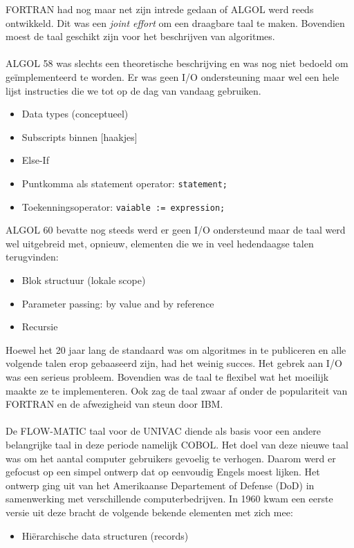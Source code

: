 \documentclass[../main.tex]{subfiles}
\begin{document}
\begin{solution}
FORTRAN had nog maar net zijn intrede gedaan of ALGOL werd reeds ontwikkeld.
Dit was een \emph{joint effort} om een draagbare taal te maken. Bovendien moest de taal geschikt zijn voor het beschrijven van algoritmes.
\\\\
ALGOL 58 was slechts een theoretische beschrijving en was nog niet bedoeld om ge\"implementeerd te worden.
Er was geen I/O ondersteuning maar wel een hele lijst instructies die we tot op de dag van vandaag gebruiken.
\begin{itemize}
		\item Data types (conceptueel)
		\item Subscripts binnen [haakjes]
		\item Else-If
		\item Puntkomma als statement operator: \texttt{statement;}
		\item Toekenningsoperator: \texttt{vaiable := expression;}
\end{itemize}
ALGOL 60 bevatte nog steeds werd er geen I/O ondersteund maar de taal werd wel uitgebreid met, opnieuw, elementen die we in veel hedendaagse talen terugvinden:
\begin{itemize}
		\item Blok structuur (lokale scope)
		\item Parameter passing: by value and by reference
		\item Recursie
\end{itemize}
Hoewel het 20 jaar lang de standaard was om algoritmes in te publiceren en alle volgende talen erop gebaaseerd zijn, had het weinig succes. Het gebrek aan I/O was een serieus probleem. Bovendien was de taal te flexibel wat het moeilijk maakte ze te implementeren. Ook zag de taal zwaar af onder de populariteit van FORTRAN en de afwezigheid van steun door IBM.
\\\\
De FLOW-MATIC taal voor de UNIVAC diende als basis voor een andere belangrijke taal in deze periode namelijk COBOL.
Het doel van deze nieuwe taal was om het aantal computer gebruikers gevoelig te verhogen.
Daarom werd er gefocust op een simpel ontwerp dat op eenvoudig Engels moest lijken.
Het ontwerp ging uit van het Amerikaanse Departement of Defense (DoD) in samenwerking met verschillende computerbedrijven.
In 1960 kwam een eerste versie uit deze bracht de volgende bekende elementen met zich mee:
\begin{itemize}
		\item Hi\"erarchische data structuren (records)

\end{itemize}
\end{solution}
\end{document}
